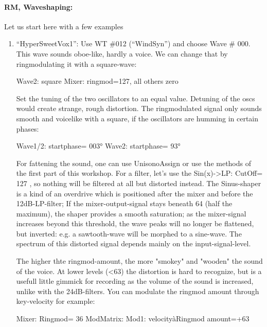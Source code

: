 \paragraph{RM, Waveshaping:}
Let us start here with a few examples
\begin{example}
	\begin{enumerate}
		\item ``HyperSweetVox1'': Use WT \#012 (``WindSyn'') and choose Wave \# 000.\\
		This wave sounds oboe-like, hardly a voice. We can change that by ringmodulating it with a square-wave:
		
		Wave2: square
		Mixer: ringmod=127, all others zero
		
		Set the tuning of the two oscillators to an equal value. Detuning of the oscs would create strange, rough distortion. The ringmodulated signal only sounds smooth and voicelike with a square, if the oscillators are humming in certain phases:
		
		Wave1/2: startphase= 003°
		Wave2: startphase= 93°
		
		For fattening the sound, one can use UnisonoAssign or use the methods of the first part of this workshop.
		For a filter, let’s use the Sin(x)->LP: CutOff= 127 , so nothing will be filtered at all but distorted instead. The Sinus-shaper is a kind of an overdrive which is positioned after the mixer and before the 12dB-LP-filter; If the mixer-output-signal stays beneath 64 (half the maximum), the shaper provides a smooth saturation; as the mixer-signal increases beyond this threshold, the wave peaks will no longer be flattened, but inverted: e.g. a sawtooth-wave will be morphed to a sine-wave. The spectrum of this distorted signal depends mainly on the input-signal-level.
		
		
		The higher thte ringmod-amount, the more "smokey" and "wooden" the sound of the voice. At lower levels (<63) the distortion is hard to recognize, but is a usefull little gimmick for recording as the volume of the sound is increased, unlike with the 24dB-filters.
		You can modulate the ringmod amount through key-velocity for example:
		
		Mixer: Ringmod= 36
		ModMatrix: Mod1: velocityàRingmod  amount=+63
		

\end{enumerate}
\end{example}
